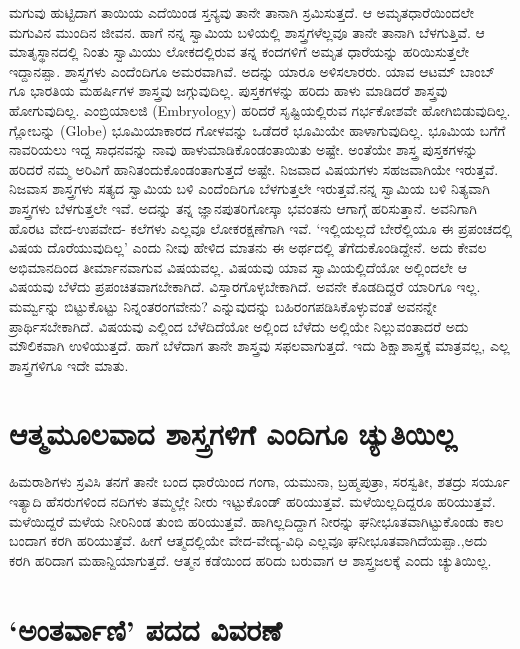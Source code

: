 ಮಗುವು ಹುಟ್ಟಿದಾಗ ತಾಯಿಯ ಎದೆಯಿಂಡ ಸ್ತನ್ಯವು ತಾನೇ ತಾನಾಗಿ ಸ್ರಮಿಸುತ್ತದೆ. ಆ ಅಮೃತಧಾರೆಯಿಂದಲೇ ಮಗುವಿನ ಮುಂದಿನ ಜೀವನ. ಹಾಗೆ ನನ್ನ ಸ್ವಾಮಿಯ ಬಳಿಯಲ್ಲಿ ಶಾಸ್ತ್ರಗಳೆಲ್ಲವೂ ತಾನೇ ತಾನಾಗಿ ಬೆಳಗುತ್ತಿವೆ. ಆ ಮಾತೃಸ್ಥಾನದಲ್ಲಿ ನಿಂತು ಸ್ವಾಮಿಯು ಲೋಕದಲ್ಲಿರುವ ತನ್ನ ಕಂದಗಳಿಗೆ ಅಮೃತ ಧಾರೆಯನ್ನು ಹರಿಯಿಸುತ್ತಲೇ ಇದ್ದಾನಪ್ಪಾ. ಶಾಸ್ತ್ರಗಳು ಎಂದೆಂದಿಗೂ ಅಮರವಾಗಿವೆ. ಅದನ್ನು  ಯಾರೂ ಅಳಿಸಲಾರರು. ಯಾವ ಆಟಮ್ ಬಾಂಬ್ ಗೂ ಭಾರತಿಯ ಮಹರ್ಷಿಗಳ ಶಾಸ್ತ್ರವು ಜಗ್ಗುವುದಿಲ್ಲ. ಪುಸ್ತಕಗಳನ್ನು ಹರಿದು ಹಾಳು ಮಾಡಿದರೆ ಶಾಸ್ತ್ರವು ಹೋಗುವುದಿಲ್ಲ.  ಎಂಬ್ರಿಯಾಲಜಿ {(\eng Embryology)} ಹರಿದರೆ ಸೃಷ್ಟಿಯಲ್ಲಿರುವ ಗರ್ಭಕೋಶವೇ ಹೋಗಿಬಿಡುವುದಿಲ್ಲ. ಗ್ಲೋಬನ್ನು {(\eng Globe)} ಭೂಮಿಯಾಕಾರದ ಗೋಳವನ್ನು ಒಡೆದರೆ ಭೂಮಿಯೇ ಹಾಳಾಗುವುದಿಲ್ಲ. ಭೂಮಿಯ ಬಗೆಗೆ ನಾವರಿಯಲು ಇದ್ದ ಸಾಧನವನ್ನು ನಾವು ಹಾಳುಮಾಡಿಕೊಂಡಂತಾಯಿತು ಅಷ್ಟೇ. ಅಂತೆಯೇ ಶಾಸ್ತ್ರ ಪುಸ್ತಕಗಳನ್ನು  ಹರಿದರೆ ನಮ್ಮ ಅರಿವಿಗೆ ಹಾನಿತಂದುಕೊಂಡಂತಾಗುತ್ತದೆ ಅಷ್ಟೇ. ನಿಜವಾದ ವಿಷಯಗಳು ಸಹಜವಾಗಿಯೇ ಇರುತ್ತವೆ.  ನಿಜವಾಸ ಶಾಸ್ತ್ರಗಳು ಸತ್ಯದ ಸ್ವಾಮಿಯ ಬಳಿ ಎಂದೆಂದಿಗೂ ಬೆಳಗುತ್ತಲೇ ಇರುತ್ತವೆ.ನನ್ನ ಸ್ವಾಮಿಯ ಬಳಿ ನಿತ್ಯವಾಗಿ ಶಾಸ್ತ್ರಗಳು ಬೆಳಗುತ್ತಲೇ ಇವೆ. ಅದನ್ನು ತನ್ನ ಜ್ಞಾನಪುತರಿಗೋಸ್ಕಾ ಭವಂತನು ಆಗಾಗ್ಗೆ ಹರಿಸುತ್ತಾನೆ. ಅವನಿಗಾಗಿ ಹೊರಟ ವೇದ-ಉಪವೇದ- ಕಲೆಗಳು ಎಲ್ಲವೂ ಲೋಕರಕ್ಷಣೆಗಾಗಿ ಇವೆ. `ಇಲ್ಲಿಯಲ್ಲದೆ ಬೇರೆಲ್ಲಿಯೂ ಈ ಪ್ರಪಂಚದಲ್ಲಿ ವಿಷಯ ದೊರೆಯುವುದಿಲ್ಲ' ಎಂದು ನೀವು ಹೇಳಿದ ಮಾತನು ಈ ಅರ್ಥದಲ್ಲಿ ತೆಗೆದುಕೊಂಡಿದ್ದೇನೆ. ಅದು ಕೇವಲ ಅಭಿಮಾನದಿಂದ ತೀರ್ಮಾನವಾಗುವ ವಿಷಯವಲ್ಲ. ವಿಷಯವು ಯಾವ ಸ್ವಾಮಿಯಲ್ಲಿದೆಯೋ ಅಲ್ಲಿಂದಲೇ ಆ ವಿಷಯವು ಬೆಳೆದು ಪ್ರಪಂಚಿತವಾಗಬೇಕಾಗಿದೆ. ವಿಸ್ತಾರಗೊಳ್ಳಬೇಕಾಗಿದೆ. ಅವನೇ ಕೊಡದಿದ್ದರೆ ಯಾರಿಗೂ ಇಲ್ಲ. ಮರ್ಮ್ವನ್ನು ಬಿಟ್ಟುಕೊಟ್ಟು ನಿನ್ನಂತರಂಗವೇನು? ಎನ್ನುವುದನ್ನು ಬಹಿರಂಗಪಡಿಸಿಕೊಳ್ಳುವಂತೆ ಅವನನ್ನೇ ಪ್ರಾರ್ಥಿಸಬೇಕಾಗಿದೆ. ವಿಷಯವು ಎಲ್ಲಿಂದ ಬೆಳೆದಿದೆಯೋ ಅಲ್ಲಿಂದ ಬೆಳೆದು ಅಲ್ಲಿಯೇ ನಿಲ್ಲುವಂತಾದರೆ ಅದು ಮೌಲಿಕವಾಗಿ ಉಳಿಯುತ್ತದೆ. ಹಾಗೆ ಬೆಳೆದಾಗ ತಾನೇ ಶಾಸ್ತ್ರವು ಸಫಲವಾಗುತ್ತದೆ. ಇದು ಶಿಕ್ಷಾಶಾಸ್ತ್ರಕ್ಕೆ ಮಾತ್ರವಲ್ಲ, ಎಲ್ಲ ಶಾಸ್ತ್ರಗಳಿಗೂ ಇದೇ ಮಾತು. 

\section*{ಆತ್ಮಮೂಲವಾದ ಶಾಸ್ತ್ರಗಳಿಗೆ ಎಂದಿಗೂ ಚ್ಯುತಿಯಿಲ್ಲ}

ಹಿಮರಾಶಿಗಳು ಸ್ರವಿಸಿ ತನಗೆ ತಾನೇ ಬಂದ ಧಾರೆಯಿಂದ ಗಂಗಾ, ಯಮುನಾ, ಬ್ರಹ್ಮಪುತ್ರಾ, ಸರಸ್ವತೀ, ಶತದ್ರು ಸರ್ಯೂ ಇತ್ಯಾದಿ ಹೆಸರುಗಳಿಂದ ನದಿಗಳು ತಮ್ಮಲ್ಲೇ ನೀರು ಇಟ್ಟುಕೊಂಡ್ ಹರಿಯುತ್ತವೆ. ಮಳೆಯಿಲ್ಲದಿದ್ದರೂ ಹರಿಯುತ್ತವೆ. ಮಳೆಯಿದ್ದರೆ ಮಳೆಯ ನೀರಿನಿಂಡ ತುಂಬಿ ಹರಿಯುತ್ತವೆ. ಹಾಗಿಲ್ಲದಿದ್ದಾಗ ನೀರನ್ನು ಘನೀಭೂತವಾಗಿಟ್ಟುಕೊಂಡು ಕಾಲ ಬಂದಾಗ ಕರಗಿ ಹರಿಯುತ್ತೆವೆ. ಹೀಗೆ ಆತ್ಮದಲ್ಲಿಯೇ ವೇದ-ವೇದ್ಯ-ವಿಧಿ ಎಲ್ಲವೂ ಘನೀಭೂತವಾಗಿದೆಯಪ್ಪಾ.,ಅದು ಕರಗಿ ಹರಿದಾಗ ಮಹಾನ್ದಿಯಾಗುತ್ತದೆ. ಆತ್ಮನ ಕಡೆಯಿಂದ ಹರಿದು ಬರುವಾಗ ಆ ಶಾಸ್ತ್ರಜಲಕ್ಕೆ ಎಂದು ಚ್ಯುತಿಯಿಲ್ಲ.

\section*{`ಅಂತರ್ವಾಣಿ' ಪದದ ವಿವರಣೆ}

